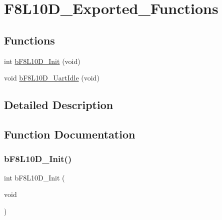 \hypertarget{group___f8_l10_d___exported___functions}{}\section{F8\+L10\+D\+\_\+\+Exported\+\_\+\+Functions}
\label{group___f8_l10_d___exported___functions}
\subsection*{Functions}
\begin{DoxyCompactItemize}
\item 
int \mbox{\hyperlink{group___f8_l10_d___exported___functions_ga849e31a9798533db9778e67b431cef2f}{b\+F8\+L10\+D\+\_\+\+Init}} (void)
\item 
void \mbox{\hyperlink{group___f8_l10_d___exported___functions_gabc8cefa3f54f3eddaaf62db7e80556c0}{b\+F8\+L10\+D\+\_\+\+Uart\+Idle}} (void)
\end{DoxyCompactItemize}


\subsection{Detailed Description}


\subsection{Function Documentation}
\mbox{\label{group___f8_l10_d___exported___functions_ga849e31a9798533db9778e67b431cef2f}} 
\subsubsection{\texorpdfstring{b\+F8\+L10\+D\+\_\+\+Init()}{bF8L10D\_Init()}}
{\footnotesize\ttfamily int b\+F8\+L10\+D\+\_\+\+Init (\begin{DoxyParamCaption}\item[{void}]{ }\end{DoxyParamCaption})}




